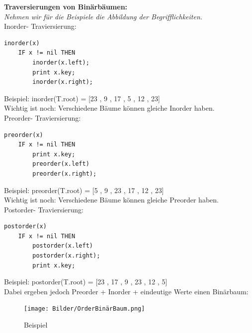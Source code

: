 \documentclass{article}
\begin{document}
            \textbf{Traversierungen von Binärbäumen:}\\
            \textit{Nehmen wir für die Beispiele die Abbildung der Begrifflichkeiten.}\\
            Inorder- Traviersierung:
            \begin{lstlisting}[style=pseudocode]
inorder(x)
    IF x != nil THEN
        inorder(x.left);
        print x.key;
        inorder(x.right);
            \end{lstlisting} 
            Beispiel: inorder(T.root) = [23 , 9 , 17 , 5 , 12 , 23] \\
            Wichtig ist noch: Verschiedene Bäume können gleiche Inorder haben. \\
            Preorder- Traviersierung:
            \begin{lstlisting}[style=pseudocode]
preorder(x)
    IF x != nil THEN
        print x.key;
        preorder(x.left)
        preorder(x.right);
            \end{lstlisting} 
            Beispiel: preorder(T.root) = [5 , 9 , 23 , 17 , 12 , 23] \\
            Wichtig ist noch: Verschiedene Bäume können gleiche Preorder haben. \\
            Postorder- Traviersierung:
            \begin{lstlisting}[style=pseudocode]
postorder(x)
    IF x != nil THEN
        postorder(x.left)
        postorder(x.right);
        print x.key;
            \end{lstlisting} 
            Beispiel: postorder(T.root) = [23 , 17 , 9 , 23 , 12 , 5] \\
            Dabei ergeben jedoch Preorder + Inorder + eindeutige Werte einen Binärbaum: \\
            \begin{figure}[ht]
                \centering
                \texttt{[image: Bilder/OrderBinärBaum.png]}
                \caption{Beispiel}
                \label{fig:OrderBinär}
            \end{figure}\\
\end{document}
